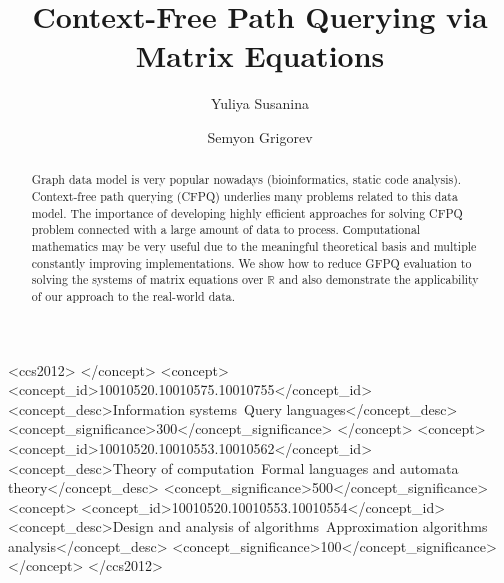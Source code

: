 \documentclass[sigconf]{acmart}
\begin{document}
\title{Context-Free Path Querying via Matrix Equations}

\author{Yuliya Susanina}

\author{Semyon Grigorev}



\begin{abstract}
  Graph data model is very popular nowadays (bioinformatics, static code analysis). 
  Context-free path querying (CFPQ) underlies many problems related to this data model.
  The importance of developing highly efficient approaches for solving CFPQ problem connected with a large amount of data to process.
  Сomputational mathematics may be very useful due to the meaningful theoretical basis and multiple constantly improving implementations.
  We show how to reduce GFPQ evaluation to solving the systems of matrix equations over $\mathbb{R}$ and also demonstrate the applicability of our approach to the real-world data.
\end{abstract}

\begin{CCSXML}
<ccs2012>
 </concept>
 <concept>
  <concept_id>10010520.10010575.10010755</concept_id>
  <concept_desc>Information systems~Query languages</concept_desc>
  <concept_significance>300</concept_significance>
 </concept>
 <concept>
  <concept_id>10010520.10010553.10010562</concept_id>
  <concept_desc>Theory of computation~Formal languages and automata theory</concept_desc>
  <concept_significance>500</concept_significance>
 <concept>
  <concept_id>10010520.10010553.10010554</concept_id>
  <concept_desc>Design and analysis of algorithms~Approximation algorithms analysis</concept_desc>
  <concept_significance>100</concept_significance>
 </concept>
</ccs2012>
\end{CCSXML}
\end{document}
